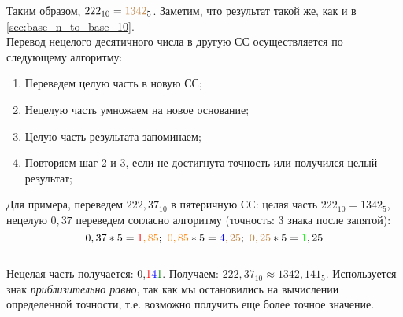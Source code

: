 \documentclass[12pt]{article}
\theoremstyle{problem_style}
\begin{document}
Таким образом, $222_{10} = {\textcolor{brown}{1342}_5}$. Заметим, что результат такой же, как и в \autoref{sec:base_n_to_base_10}. \\ 
Перевод нецелого десятичного числа в другую СС осуществляется по следующему алгоритму:
\begin{enumerate}
    \item Переведем целую часть в новую СС;
    \item Нецелую часть умножаем на новое основание;
    \item Целую часть результата запоминаем;
    \item Повторяем шаг 2 и 3, если не достигнута точность или получился целый результат;
\end{enumerate}
Для примера, переведем $222,37_{10}$ в пятеричную СС: целая часть $222_{10} = 1342_5$, нецелую $0,37$ переведем согласно алгоритму (точность: 3 знака после запятой):
\[0,37 * 5 = \textcolor{red}{1}\textcolor{orange}{,85}; \,\, \textcolor{orange}{0,85} * 5 = \textcolor{blue}{4}\textcolor{brown}{,25}; \,\, \textcolor{brown}{0,25} * 5 = \textcolor{green}{1},25\]\\
Нецелая часть получается: 0,\textcolor{red}{1}\textcolor{blue}{4}\textcolor{green}{1}. Получаем: $222,37_{10} \approx 1342,141_5$. Используется знак \textit{приблизительно равно}, так как мы остановились на вычислении определенной точности, т.е. возможно получить еще более точное значение.
\end{document}
